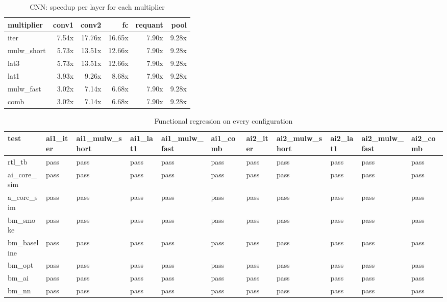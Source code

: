 \begin{table}[t]
\centering
\caption{CNN: speedup per layer for each multiplier}
\label{tab:cnn_mulsweep_layers}
\begin{tabular}{lrrrrr}
\toprule
multiplier & conv1 & conv2 & fc & requant & pool \\
\midrule
iter & 7.54x & 17.76x & 16.65x & 7.90x & 9.28x \\
mulw\_short & 5.73x & 13.51x & 12.66x & 7.90x & 9.28x \\
lat3 & 5.73x & 13.51x & 12.66x & 7.90x & 9.28x \\
lat1 & 3.93x & 9.26x & 8.68x & 7.90x & 9.28x \\
mulw\_fast & 3.02x & 7.14x & 6.68x & 7.90x & 9.28x \\
comb & 3.02x & 7.14x & 6.68x & 7.90x & 9.28x \\
\bottomrule
\end{tabular}
\end{table}

\begin{table}[t]
\centering
\caption{Functional regression on every configuration}
\label{tab:config_matrix}
\begin{tabular}{lllllllllll}
\toprule
test & ai1\_iter & ai1\_mulw\_short & ai1\_lat1 & ai1\_mulw\_fast & ai1\_comb & ai2\_iter & ai2\_mulw\_short & ai2\_lat1 & ai2\_mulw\_fast & ai2\_comb \\
\midrule
rtl\_tb & pass & pass & pass & pass & pass & pass & pass & pass & pass & pass \\
ai\_core\_sim & pass & pass & pass & pass & pass & pass & pass & pass & pass & pass \\
a\_core\_sim & pass & pass & pass & pass & pass & pass & pass & pass & pass & pass \\
bm\_smoke & pass & pass & pass & pass & pass & pass & pass & pass & pass & pass \\
bm\_baseline & pass & pass & pass & pass & pass & pass & pass & pass & pass & pass \\
bm\_opt & pass & pass & pass & pass & pass & pass & pass & pass & pass & pass \\
bm\_ai & pass & pass & pass & pass & pass & pass & pass & pass & pass & pass \\
bm\_nn & pass & pass & pass & pass & pass & pass & pass & pass & pass & pass \\
\bottomrule
\end{tabular}
\end{table}

